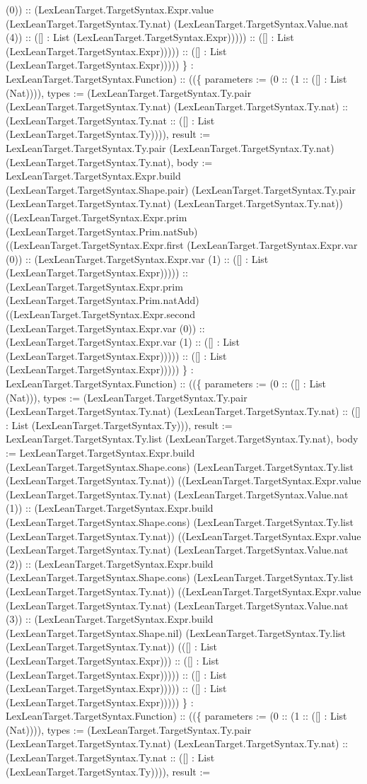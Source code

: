 \documentclass[11pt]{article}
\begin{document}
(0)) :: (LexLeanTarget.TargetSyntax.Expr.value (LexLeanTarget.TargetSyntax.Ty.nat) (LexLeanTarget.TargetSyntax.Value.nat (4)) :: ([] : List (LexLeanTarget.TargetSyntax.Expr))))) :: ([] : List (LexLeanTarget.TargetSyntax.Expr))))) :: ([] : List (LexLeanTarget.TargetSyntax.Expr))))) \} : LexLeanTarget.TargetSyntax.Function) :: ((\{ parameters := (0 :: (1 :: ([] : List (Nat)))), types := (LexLeanTarget.TargetSyntax.Ty.pair (LexLeanTarget.TargetSyntax.Ty.nat) (LexLeanTarget.TargetSyntax.Ty.nat) :: (LexLeanTarget.TargetSyntax.Ty.nat :: ([] : List (LexLeanTarget.TargetSyntax.Ty)))), result := LexLeanTarget.TargetSyntax.Ty.pair (LexLeanTarget.TargetSyntax.Ty.nat) (LexLeanTarget.TargetSyntax.Ty.nat), body := LexLeanTarget.TargetSyntax.Expr.build (LexLeanTarget.TargetSyntax.Shape.pair) (LexLeanTarget.TargetSyntax.Ty.pair (LexLeanTarget.TargetSyntax.Ty.nat) (LexLeanTarget.TargetSyntax.Ty.nat)) ((LexLeanTarget.TargetSyntax.Expr.prim (LexLeanTarget.TargetSyntax.Prim.natSub) ((LexLeanTarget.TargetSyntax.Expr.first (LexLeanTarget.TargetSyntax.Expr.var (0)) :: (LexLeanTarget.TargetSyntax.Expr.var (1) :: ([] : List (LexLeanTarget.TargetSyntax.Expr))))) :: (LexLeanTarget.TargetSyntax.Expr.prim (LexLeanTarget.TargetSyntax.Prim.natAdd) ((LexLeanTarget.TargetSyntax.Expr.second (LexLeanTarget.TargetSyntax.Expr.var (0)) :: (LexLeanTarget.TargetSyntax.Expr.var (1) :: ([] : List (LexLeanTarget.TargetSyntax.Expr))))) :: ([] : List (LexLeanTarget.TargetSyntax.Expr))))) \} : LexLeanTarget.TargetSyntax.Function) :: ((\{ parameters := (0 :: ([] : List (Nat))), types := (LexLeanTarget.TargetSyntax.Ty.pair (LexLeanTarget.TargetSyntax.Ty.nat) (LexLeanTarget.TargetSyntax.Ty.nat) :: ([] : List (LexLeanTarget.TargetSyntax.Ty))), result := LexLeanTarget.TargetSyntax.Ty.list (LexLeanTarget.TargetSyntax.Ty.nat), body := LexLeanTarget.TargetSyntax.Expr.build (LexLeanTarget.TargetSyntax.Shape.cons) (LexLeanTarget.TargetSyntax.Ty.list (LexLeanTarget.TargetSyntax.Ty.nat)) ((LexLeanTarget.TargetSyntax.Expr.value (LexLeanTarget.TargetSyntax.Ty.nat) (LexLeanTarget.TargetSyntax.Value.nat (1)) :: (LexLeanTarget.TargetSyntax.Expr.build (LexLeanTarget.TargetSyntax.Shape.cons) (LexLeanTarget.TargetSyntax.Ty.list (LexLeanTarget.TargetSyntax.Ty.nat)) ((LexLeanTarget.TargetSyntax.Expr.value (LexLeanTarget.TargetSyntax.Ty.nat) (LexLeanTarget.TargetSyntax.Value.nat (2)) :: (LexLeanTarget.TargetSyntax.Expr.build (LexLeanTarget.TargetSyntax.Shape.cons) (LexLeanTarget.TargetSyntax.Ty.list (LexLeanTarget.TargetSyntax.Ty.nat)) ((LexLeanTarget.TargetSyntax.Expr.value (LexLeanTarget.TargetSyntax.Ty.nat) (LexLeanTarget.TargetSyntax.Value.nat (3)) :: (LexLeanTarget.TargetSyntax.Expr.build (LexLeanTarget.TargetSyntax.Shape.nil) (LexLeanTarget.TargetSyntax.Ty.list (LexLeanTarget.TargetSyntax.Ty.nat)) (([] : List (LexLeanTarget.TargetSyntax.Expr))) :: ([] : List (LexLeanTarget.TargetSyntax.Expr))))) :: ([] : List (LexLeanTarget.TargetSyntax.Expr))))) :: ([] : List (LexLeanTarget.TargetSyntax.Expr))))) \} : LexLeanTarget.TargetSyntax.Function) :: ((\{ parameters := (0 :: (1 :: ([] : List (Nat)))), types := (LexLeanTarget.TargetSyntax.Ty.pair (LexLeanTarget.TargetSyntax.Ty.nat) (LexLeanTarget.TargetSyntax.Ty.nat) :: (LexLeanTarget.TargetSyntax.Ty.nat :: ([] : List (LexLeanTarget.TargetSyntax.Ty)))), result := 
\end{document}
